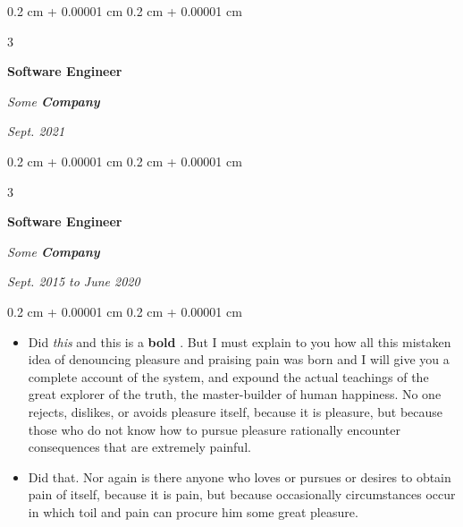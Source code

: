 \documentclass[10pt, letterpaper]{article}
\newenvironment{highlights}{
    \begin{itemize}[
        topsep=0.10 cm,
        parsep=0.10 cm,
        partopsep=0pt,
        itemsep=0pt,
        leftmargin=0.4 cm + 10pt + 0.6 cm
    ]
}{
    \end{itemize}
} %
\newenvironment{onecolentry}{
    \begin{adjustwidth}{
        0.2 cm + 0.00001 cm
    }{
        0.2 cm + 0.00001 cm
    }
}{
    \end{adjustwidth}
} %
\newenvironment{threecolentry}[3][]{
    \onecolentry
    \def\thirdColumn{#3}
    \setcolumnwidth{0.6 cm, \fill, 4.5 cm}
    \begin{paracol}{3}
    #2 \switchcolumn
}{
    \switchcolumn \raggedleft \thirdColumn
    \end{paracol}
    \endonecolentry
} %
\let\hrefWithoutArrow\href
\renewcommand{\href}[2]{\hrefWithoutArrow{#1}{\mbox{\ifthenelse{\equal{#2}{}}{ }{#2 }\raisebox{.15ex}{\footnotesize \faExternalLink*}}}}
\begin{document}
        \vspace{0.2 cm-3px}

        \begin{threecolentry}{
            \vspace*{\fill}
            \textbullet
            \vspace*{3px}
            \vspace*{\fill}
        }{
            
            
        \textit{Sept. 2021}}
            \textbf{Software Engineer}
            
            \textit{Some \textbf{Company}}
        \end{threecolentry}



        \vspace{0.2 cm-3px}

        \begin{threecolentry}{
            \vspace*{\fill}
            \textbullet
            \vspace*{3px}
            \vspace*{\fill}
        }{
            
            
        \textit{Sept. 2015 to June 2020}}
            \textbf{Software Engineer}
            
            \textit{Some \textbf{Company}}
        \end{threecolentry}

        \vspace{0.10 cm-3px}
        \begin{onecolentry}
            \begin{highlights}
                \item Did \textit{this} and this is a \textbf{bold} \href{https://example.com}{link}. But I must explain to you how all this mistaken idea of denouncing pleasure and praising pain was born and I will give you a complete account of the system, and expound the actual teachings of the great explorer of the truth, the master-builder of human happiness. No one rejects, dislikes, or avoids pleasure itself, because it is pleasure, but because those who do not know how to pursue pleasure rationally encounter consequences that are extremely painful.
                \item Did that. Nor again is there anyone who loves or pursues or desires to obtain pain of itself, because it is pain, but because occasionally circumstances occur in which toil and pain can procure him some great pleasure.
            \end{highlights}
        \end{onecolentry}
\end{document}
